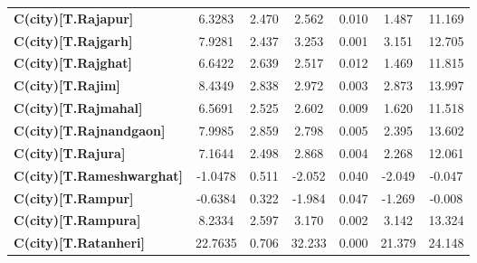 \begin{center}
\begin{tabular}{lcccccc}
\textbf{C(city)[T.Rajapur]}                                                                         &       6.3283  &        2.470     &     2.562  &         0.010        &        1.487    &       11.169     \\
\textbf{C(city)[T.Rajgarh]}                                                                         &       7.9281  &        2.437     &     3.253  &         0.001        &        3.151    &       12.705     \\
\textbf{C(city)[T.Rajghat]}                                                                         &       6.6422  &        2.639     &     2.517  &         0.012        &        1.469    &       11.815     \\
\textbf{C(city)[T.Rajim]}                                                                           &       8.4349  &        2.838     &     2.972  &         0.003        &        2.873    &       13.997     \\
\textbf{C(city)[T.Rajmahal]}                                                                        &       6.5691  &        2.525     &     2.602  &         0.009        &        1.620    &       11.518     \\
\textbf{C(city)[T.Rajnandgaon]}                                                                     &       7.9985  &        2.859     &     2.798  &         0.005        &        2.395    &       13.602     \\
\textbf{C(city)[T.Rajura]}                                                                          &       7.1644  &        2.498     &     2.868  &         0.004        &        2.268    &       12.061     \\
\textbf{C(city)[T.Rameshwarghat]}                                                                   &      -1.0478  &        0.511     &    -2.052  &         0.040        &       -2.049    &       -0.047     \\
\textbf{C(city)[T.Rampur]}                                                                          &      -0.6384  &        0.322     &    -1.984  &         0.047        &       -1.269    &       -0.008     \\
\textbf{C(city)[T.Rampura]}                                                                         &       8.2334  &        2.597     &     3.170  &         0.002        &        3.142    &       13.324     \\
\textbf{C(city)[T.Ratanheri]}                                                                       &      22.7635  &        0.706     &    32.233  &         0.000        &       21.379    &       24.148     \\

\end{tabular}
\end{center}
